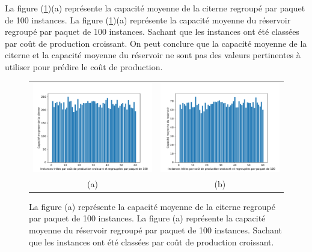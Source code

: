 La figure (\ref{6000_capacité})(a) représente la capacité moyenne de la citerne regroupé par paquet de 100 instances. La figure (\ref{6000_capacité})(a) représente la capacité moyenne du réservoir regroupé par paquet de 100 instances. Sachant que les instances ont été classées par coût de production croissant. On peut conclure que la capacité moyenne de la citerne et la capacité moyenne du réservoir ne sont pas des valeurs pertinentes à utiliser pour prédire le coût de production.

\begin{figure}[H]
	\centering
	\begin{tabular}{c c}
		\includegraphics[width=9cm]{images_these/Stats_instances_citerne.pdf} &
		\includegraphics[width=9cm]{images_these/Stats_instances_reservoir.pdf}
		\\
		(a) & (b)
	\end{tabular}
	\caption[Capacité moyenne du réservoir et de la citerne regroupé par paquet de 100 instances]{La figure (a) représente la capacité moyenne de la citerne regroupé par paquet de 100 instances. La figure (a) représente la capacité moyenne du réservoir regroupé par paquet de 100 instances. Sachant que les instances ont été classées par coût de production croissant.}\label{6000_capacité}
\end{figure}


